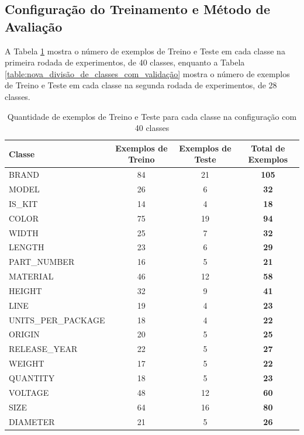 \subsection{Configuração do Treinamento e Método de Avaliação}
A Tabela \ref{table:divisão_de_classes_com_validação} mostra o número de exemplos de Treino e Teste em cada classe na primeira rodada de experimentos, de 40 classes, enquanto a Tabela \ref{table:nova_divisão_de_classes_com_validação} mostra o número de exemplos de Treino e Teste em cada classe na segunda rodada de experimentos, de 28 classes.

\begin{table}[ht]
\caption{Quantidade de exemplos de Treino e Teste para cada classe na configuração com 40 classes}
\label{table:divisão_de_classes_com_validação}
\tiny %
\begin{tabularx}{\textwidth}{|X|c|c|c|} 
 \hline
 \textbf{Classe} & \textbf{Exemplos de Treino} & \textbf{Exemplos de Teste} & \textbf{Total de Exemplos} \\
 \hline
 BRAND & 84 & 21 & \textbf{105}\\
 \hline
 MODEL & 26 & 6 & \textbf{32}\\
 \hline
 IS\_KIT & 14 & 4 & \textbf{18}\\
 \hline
 COLOR & 75 & 19 & \textbf{94}\\
 \hline
 WIDTH & 25 & 7 & \textbf{32}\\
 \hline
 LENGTH & 23 & 6 & \textbf{29}\\
 \hline
 PART\_NUMBER & 16 & 5 & \textbf{21}\\
 \hline
 MATERIAL & 46 & 12 & \textbf{58}\\
 \hline
 HEIGHT & 32 & 9 & \textbf{41}\\
 \hline
 LINE & 19 & 4 & \textbf{23}\\
 \hline
 UNITS\_PER\_PACKAGE & 18 & 4 & \textbf{22}\\
 \hline
 ORIGIN & 20 & 5 & \textbf{25}\\
 \hline
 RELEASE\_YEAR & 22 & 5 & \textbf{27}\\
 \hline
 WEIGHT & 17 & 5 & \textbf{22}\\
 \hline
 QUANTITY & 18 & 5 & \textbf{23}\\
 \hline
 VOLTAGE & 48 & 12 & \textbf{60}\\
 \hline
 SIZE & 64 & 16 & \textbf{80}\\
 \hline
 DIAMETER & 21 & 5 & \textbf{26}\\
 \hline

\end{tabularx}
\end{table}
